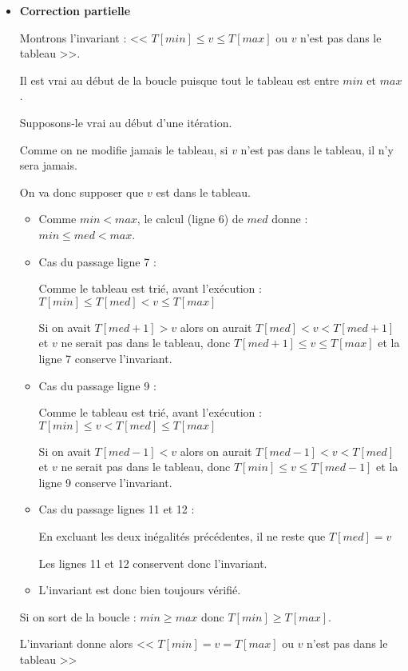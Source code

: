 \begin{itemize}
	\item {\bfseries Correction partielle} 
	
	Montrons l'invariant : << $T[min] \leqslant v \leqslant T[max]$ ou $v$ n'est pas dans le tableau >>.
	
	Il est vrai au début de la boucle puisque tout le tableau est entre $min$ et $max$.
	
	Supposons-le vrai au début d'une itération.
	
	Comme on ne modifie jamais le tableau, si $v$ n'est pas dans le tableau, il n'y sera jamais.
	
	On va donc supposer que $v$ est dans le tableau.
	
	\begin{itemize}
		\item Comme $min < max$, le calcul (ligne 6) de $med$ donne : $min \leqslant med < max$.
		\item Cas du passage ligne 7 : 
		
		Comme le tableau est trié,  avant l'exécution : $T[min] \leqslant T[med] < v \leqslant T[max]$
		
		Si on avait $T[med+1] > v$ alors on aurait $T[med]< v <T[med+1]$ et $v$ ne serait pas dans le tableau, donc $T[med+1] \leqslant v \leqslant T[max]$ et la ligne 7 conserve l'invariant.
		\item Cas du passage ligne 9 : 
		
		Comme le tableau est trié,  avant l'exécution : $T[min] \leqslant v < T[med]  \leqslant T[max]$
		
		Si on avait $T[med-1] < v$ alors on aurait $T[med-1]< v <T[med]$ et $v$ ne serait pas dans le tableau, donc $T[min] \leqslant v \leqslant T[med-1]$ et la ligne 9 conserve l'invariant.
		
		\item Cas du passage lignes 11 et 12 : 
		
		En excluant les deux inégalités précédentes, il ne reste que  $T[med] = v$
		
		Les lignes 11 et 12 conservent donc l'invariant.
		
		
		\item L'invariant est donc bien toujours vérifié.
	\end{itemize}
	
	Si on sort de la boucle : $min \geqslant max$ donc $T[min] \geqslant T[max]$.
	
	L'invariant donne alors << $T[min] = v = T[max]$ ou $v$ n'est pas dans le tableau >>
	

\end{itemize}
